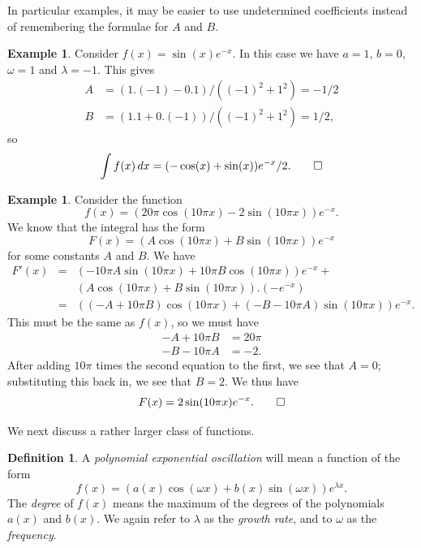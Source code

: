 \documentclass[a4paper]{book}
\newcommand{\PURPLE}[1]{{\color{purple}#1}}
\newcommand{\lm}        {\lambda}
\newcommand{\om}        {\omega}
\renewcommand{\:}{\colon}
\newcommand{\DEFN}[1]{\PURPLE{\emph{#1}}}
\theoremstyle{definition}
\newtheorem{definition}[theorem]{Definition}
\newtheorem{example}[theorem]{Example}
\begin{document}
In particular examples, it may be easier to use undetermined
coefficients instead of remembering the formulae for $A$ and $B$.
\begin{example}
 Consider $f(x)=\sin(x)e^{-x}$.  In this case we have $a=1$, $b=0$,
 $\om=1$ and $\lm=-1$.  This gives 
 \begin{align*}
  A &= (1.(-1)-0.1)/((-1)^2+1^2) = -1/2 \\
  B &= (1.1+0.(-1))/((-1)^2+1^2) = 1/2,
 \end{align*}
 so
 \[ \int f(x)\, dx = (-\cos(x)+\sin(x)) e^{-x}/2. \qed \]
\end{example}
\begin{example}
 Consider the function 
 \[ f(x) = (20\pi \cos(10\pi x) - 2 \sin(10\pi x)) e^{-x}. \]
 We know that the integral has the form
 \[ F(x) = (A\cos(10\pi x) + B\sin(10\pi x)) e^{-x} \]
 for some constants $A$ and $B$.  We have 
 \begin{eqnarray*}
  F'(x)
   &=& (-10\pi A\sin(10\pi x) + 10\pi B\cos(10\pi x)) e^{-x} + \\
   &&  (A\cos(10\pi x) + B\sin(10\pi x)). (-e^{-x}) \\
   &=& ((-A+10\pi B)\cos(10\pi x) + (-B-10\pi A)\sin(10\pi x))e^{-x}. 
 \end{eqnarray*}
 This must be the same as $f(x)$, so we must have
 \begin{align*}
  -A+10\pi B &= 20\pi \\
  -B-10\pi A &= -2.
 \end{align*}
 After adding $10\pi$ times the second equation to the first, we see
 that $A=0$; substituting this back in, we see that $B=2$.  We thus
 have 
 \[ F(x) = 2\sin(10\pi x)e^{-x}. \qed \]
\end{example}

We next discuss a rather larger class of functions.  
\begin{definition}
 A \DEFN{polynomial exponential oscillation} will mean a function of
 the form
 \[ f(x) = (a(x)\cos(\om x) + b(x)\sin(\om x)) e^{\lm x}. \]
 The \DEFN{degree} of $f(x)$ means the maximum of the degrees of the
 polynomials $a(x)$ and $b(x)$.  We again refer to $\lm$ as the
 \DEFN{growth rate}, and to $\om$ as the \DEFN{frequency}.
\end{definition}
\end{document}
